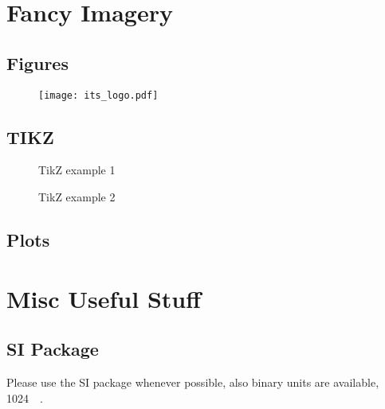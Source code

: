 \documentclass{uibk}
\begin{document}
\newpage

\section{Fancy Imagery}
\label{sec:fancy_imagery}

\subsection{Figures}
\label{sub:figures}

\begin{figure}[H]
    \centering
    \texttt{[image: its\_logo.pdf]}
    \label{fig:its_logo}
\end{figure}

\subsection{TIKZ}
\label{sub:tikz}

\begin{figure}[h]
    \centering
    
    \caption{TikZ example 1}
    \label{fig:tikz1}
\end{figure}

\begin{figure}[h]
    \centering
    
    \caption{TikZ example 2}
    \label{fig:tikz2}
\end{figure}

\subsection{Plots}
\label{sub:plots}

\begin{center}
    
\end{center}

\newpage

\section{Misc Useful Stuff}
\label{sec:misc_useful_stuff}

\subsection{SI Package}
\label{sub:si_package}

Please use the SI package whenever possible, also binary units are available,
\SI{1024}{\mega\byte}.
\end{document}
